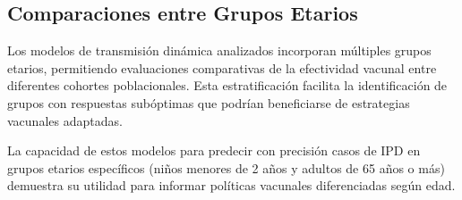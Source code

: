 \subsection{Comparaciones entre Grupos Etarios}

Los modelos de transmisión dinámica analizados incorporan múltiples grupos etarios, permitiendo evaluaciones comparativas de la efectividad vacunal entre diferentes cohortes poblacionales. Esta estratificación facilita la identificación de grupos con respuestas subóptimas que podrían beneficiarse de estrategias vacunales adaptadas.

La capacidad de estos modelos para predecir con precisión casos de IPD en grupos etarios específicos (niños menores de 2 años y adultos de 65 años o más) demuestra su utilidad para informar políticas vacunales diferenciadas según edad.







